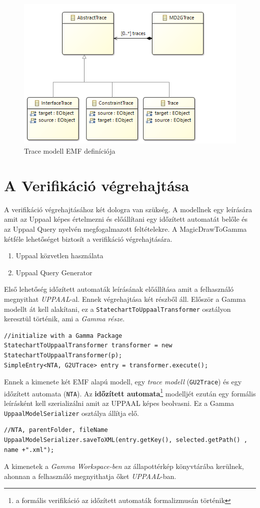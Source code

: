 \begin{figure}[ht]
	\centering
	\includegraphics[keepaspectratio, width=140mm]{figures/trace-model.png}
	\caption{Trace modell EMF definíciója}
	\label{fig:trace-model}
\end{figure}


\section{A Verifikáció végrehajtása}
A verifikáció végrehajtásához két dologra van szükség. A modellnek egy leírására amit az Uppaal képes értelmezni és előállítani egy időzített automatát belőle és az Uppaal Query nyelvén megfogalmazott feltételekre. A MagicDrawToGamma kétféle lehetőséget biztosít a verifikáció végrehajtására.

\begin{enumerate}
	\item Uppaal közvetlen használata
	\item Uppaal Query Generator
	\label{en:fels}
\end{enumerate}

Első lehetőség időzített automaták leírásának előállítása amit a felhasználó megnyithat \emph{UPPAAL}-al. Ennek végrehajtása két részből áll. Először a Gamma modellt át kell alakítani, ez a \verb+StatechartToUppaalTransformer+ osztályon keresztül történik, ami a \emph{Gamma része}.
\begin{lstlisting}
//initialize with a Gamma Package
StatechartToUppaalTransformer transformer = new StatechartToUppaalTransformer(p);
SimpleEntry<NTA, G2UTrace> entry = transformer.execute();
\end{lstlisting}
Ennek a kimenete két EMF alapú modell, egy \emph{trace modell} (\verb+GU2Trace+) és egy időzített automata (\verb+NTA+). Az \textbf{időzített automata}\footnote{a formális verifikáció az időzített automaták formalizmusán történik} modelljét ezután egy formális leírásként kell szerializálni amit az UPPAAL képes beolvasni. Ez a Gamma \verb+UppaalModelSerializer+ osztálya állítja elő. 
\begin{lstlisting}
//NTA, parentFolder, fileName
UppaalModelSerializer.saveToXML(entry.getKey(), selected.getPath() , name +".xml");
\end{lstlisting}
A kimenetek a \emph{Gamma Workspace-ben} az állapottérkép könyvtárába kerülnek, ahonnan a felhasználó megnyithatja őket \emph{UPPAAL}-ban.

